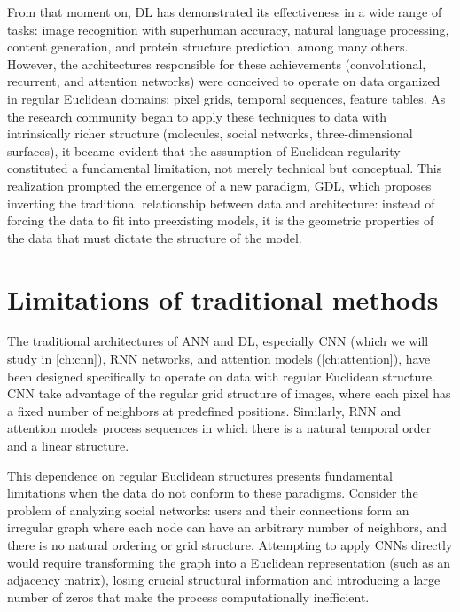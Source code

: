 From that moment on, \gls{DL} has demonstrated its effectiveness in a wide range of tasks: image recognition with superhuman accuracy, natural language processing, content generation, and protein structure prediction, among many others. However, the architectures responsible for these achievements (convolutional, recurrent, and attention networks) were conceived to operate on data organized in regular Euclidean domains: pixel grids, temporal sequences, feature tables. As the research community began to apply these techniques to data with intrinsically richer structure (molecules, social networks, three-dimensional surfaces), it became evident that the assumption of Euclidean regularity constituted a fundamental limitation, not merely technical but conceptual. This realization prompted the emergence of a new paradigm, \gls{GDL}, which proposes inverting the traditional relationship between data and architecture: instead of forcing the data to fit into preexisting models, it is the geometric properties of the data that must dictate the structure of the model.

\section{Limitations of traditional methods}\label{sec:limitaciones_tradicionales}

The traditional architectures of \gls{ANN} and \gls{DL}, especially \gls{CNN} (which we will study in \autoref{ch:cnn}), \gls{RNN} networks, and attention models (\autoref{ch:attention}), have been designed specifically to operate on data with regular Euclidean structure. \gls{CNN} take advantage of the regular grid structure of images, where each pixel has a fixed number of neighbors at predefined positions. Similarly, \gls{RNN} and attention models process sequences in which there is a natural temporal order and a linear structure.

This dependence on regular Euclidean structures presents fundamental limitations when the data do not conform to these paradigms. Consider the problem of analyzing social networks: users and their connections form an irregular graph where each node can have an arbitrary number of neighbors, and there is no natural ordering or grid structure. Attempting to apply \glspl{CNN} directly would require transforming the graph into a Euclidean representation (such as an adjacency matrix), losing crucial structural information and introducing a large number of zeros that make the process computationally inefficient.

